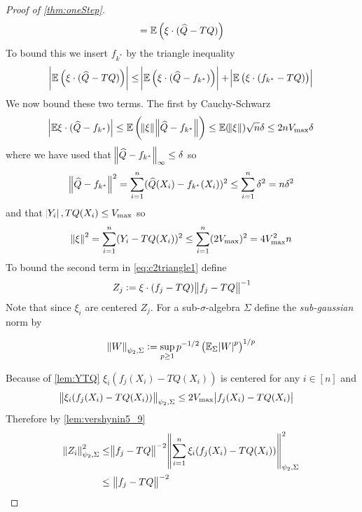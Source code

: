 \begin{proof}[Proof of \cref{thm:oneStep}]
\begin{equation}
    = \mathbb{E} \left( \xi \cdot (\widehat{Q} - TQ) \right)
  \end{equation}
  To bound this we insert $f_{k^*}$ by the triangle inequality
  \begin{equation}
    \abs{\mathbb{E} \left( \xi \cdot (\widehat{Q} - TQ) \right) }
    \leq \abs{\mathbb{E} \left( \xi \cdot (\widehat{Q} - f_{k^*}) \right) } 
    + \abs{\mathbb{E} \left( \xi \cdot (f_{k^*} - TQ) \right) }
    \label{eq:c2triangle1}
  \end{equation}
  We now bound these two terms. The first by Cauchy-Schwarz
  \begin{equation}
    \abs{\mathbb{E} \xi \cdot (\widehat{Q} - f_{k^*})}
    \leq \mathbb{E} \left( \norm{\xi} \norm{\widehat{Q} - f_{k^*}} \right)
    \leq \mathbb{E} (\norm{\xi}) \sqrt{n} \delta
    \leq 2 n V_{\max} \delta
    \label{eq:c2firstcs}
  \end{equation}
  where we have used that $\norm{\widehat{Q} - f_{k^*}}_\infty \leq \delta$ so
  \begin{equation}
    \norm{\widehat{Q} - f_{k^*}}^2
    = \sum_{i=1}^n (\widehat{Q}(X_i) - f_{k^*}(X_i))^2
    \leq \sum_{i=1}^n \delta^2
    = n \delta^2
  \end{equation}
  and that $\abs{Y_i}, TQ(X_i) \leq V_{\max}$ so
  \begin{equation}
    \norm{\xi}^2 = \sum_{i=1}^n (Y_i - TQ(X_i))^2 
    \leq \sum_{i=1}^n (2 V_{\max})^2
    = 4 V_{\max}^2 n
  \end{equation}
  To bound the second term in \cref{eq:c2triangle1} define
  \begin{equation}
  Z_j := \xi \cdot (f_j - TQ) \norm{f_j - TQ}^{-1}
  \end{equation}
  Note that since $\xi_i$ are centered $Z_j$.
  For a sub-$\sigma$-algebra $\Sigma$ define the \emph{sub-gaussian} norm by
  \begin{defn}
    \[ \norm{W}_{\psi_2,\Sigma} \vcentcolon=
    \sup_{p\geq 1} p^{-1/2} \left( \mathbb{E}_{\Sigma} \abs{W}^p \right)^{1/p} \]
  \end{defn}
  Because of \cref{lem:YTQ} $\xi_i (f_j(X_i) - TQ(X_i))$ is centered for any
  $i \in [n]$ and
  \begin{align}
    \norm{\xi_i(f_j(X_i) - TQ(X_i))}_{\psi_2, \Sigma}
    \leq &\; 2 V_{\max} \abs{f_j(X_i) - TQ(X_i)}
  \end{align}
  Therefore by \cref{lem:vershynin5_9}
  \begin{align}
    \norm{Z_i}_{\psi_2, \Sigma}^2
    \leq & \norm{f_j - TQ}^{-2}
    \norm{\sum_{i=1}^n \xi_i (f_j(X_i) - TQ(X_i))}_{\psi_2, \Sigma}^2
    \\ \leq &\; \norm{f_j - TQ}^{-2}

\end{align}
\end{proof}
